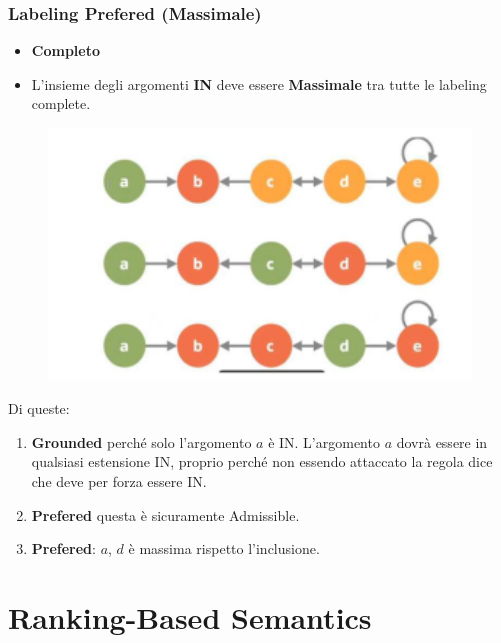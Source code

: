     \subsection{Labeling Prefered (Massimale)}
    \begin{itemize}
        \item \textbf{Completo}
        \item L'insieme degli argomenti \textbf{IN} deve essere
              \textbf{Massimale} tra tutte le labeling complete.
    \end{itemize}
    \begin{figure}[htp]
        \centering
        \includegraphics[width=12cm, keepaspectratio]{img/Cap7/GR.png}
    \end{figure}
    Di queste:
    \begin{enumerate}
        \item \textbf{Grounded} perché solo l'argomento $a$ è IN. L'argomento
              $a$ dovrà essere in qualsiasi estensione IN, proprio perché non essendo
              attaccato la regola dice che deve per forza essere IN.
        \item \textbf{Prefered} questa è sicuramente Admissible.
        \item \textbf{Prefered}: $a$, $d$ è massima rispetto l'inclusione.
    \end{enumerate}


    \chapter{Ranking-Based Semantics} \label{Ranking-Based Semantics}
